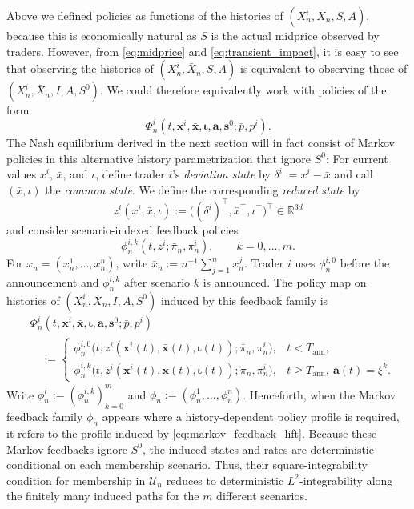 \documentclass[12pt]{article}
\numberwithin{equation}{section}
\theoremstyle{definition}
\begin{document}
Above we defined policies as functions of the histories of
\((X_n^i,\bar X_n,S,A)\), because this is economically natural
as \(S\) is the actual midprice observed by traders. However,
from \eqref{eq:midprice} and \eqref{eq:transient_impact}, it is easy to see that
observing the histories of \((X_n^i,\bar X_n,S,A)\) is equivalent to observing
those of \((X_n^i,\bar X_n,I,A,S^0)\). We could therefore equivalently work
with policies of the form
\begin{equation}\label{eq:equivalent_history_policy_parametrization}
\Phi_n^i(t,\mathbf{x}^i,\bar{\mathbf{x}},\boldsymbol{\iota},\mathbf{a},\mathbf{s}^0;\bar p,p^i).
\end{equation}
The Nash equilibrium derived
in the next section will in fact consist of Markov policies in this alternative
history parametrization that ignore \(S^0\):
For current values \(x^i\), \(\bar x\), and \(\iota\), define trader
\(i\)'s \emph{deviation state} by \(\delta^i:=x^i-\bar x\) and call
\((\bar x,\iota)\) the \emph{common state}. We define the corresponding \emph{reduced state} by
\begin{equation}\label{eq:reduced_state}
z^i(x^i,\bar x,\iota)
:=
\bigl((\delta^i)^\top,\bar x^\top,\iota^\top\bigr)^\top
\in\mathbb R^{3d}
\end{equation}
and consider scenario-indexed feedback policies
\begin{equation}\label{eq:markov_feedback}
\phi_n^{i,k}(t,z^i;\bar\pi_n,\pi_n^i),
\qquad k=0,\ldots,m.
\end{equation}
For \(x_n=(x_n^1,\ldots,x_n^n)\), write
\(\bar x_n:=n^{-1}\sum_{j=1}^n x_n^j\).
Trader \(i\) uses \(\phi_n^{i,0}\) before the announcement and
\(\phi_n^{i,k}\) after scenario \(k\) is announced. The policy map on
histories of \((X_n^i,\bar X_n,I,A,S^0)\) induced by this feedback family is
\begin{equation}\label{eq:markov_feedback_lift}
\begin{aligned}
&\Phi_n^i(t,\mathbf{x}^i,\bar{\mathbf{x}},\boldsymbol{\iota},\mathbf{a},\mathbf{s}^0;
\bar p,p^i)
\\
&\quad:=
\begin{cases}
\phi_n^{i,0}
\bigl(t,z^i(\mathbf{x}^i(t),\bar{\mathbf{x}}(t),\boldsymbol{\iota}(t));\bar\pi_n,\pi_n^i\bigr),
&t<T_{\mathrm{ann}},\\[2pt]
\phi_n^{i,k}
\bigl(t,z^i(\mathbf{x}^i(t),\bar{\mathbf{x}}(t),\boldsymbol{\iota}(t));\bar\pi_n,\pi_n^i\bigr),
&t\geq T_{\mathrm{ann}},\ \mathbf{a}(t)=\xi^k.
\end{cases}
\end{aligned}
\end{equation}
Write \(\phi_n^i:=(\phi_n^{i,k})_{k=0}^m\) and
\(\phi_n:=(\phi_n^1,\ldots,\phi_n^n)\). Henceforth, when the Markov feedback
family \(\phi_n\) appears where a history-dependent policy profile is
required, it refers to the profile induced by
\eqref{eq:markov_feedback_lift}.
Because these Markov
feedbacks ignore \(S^0\), the induced states and rates are deterministic
conditional on each membership scenario. Thus, their square-integrability condition for membership
in \(\mathcal U_n\) reduces to deterministic \(L^2\)-integrability along the
finitely many induced paths for the \(m\) different scenarios.
\end{document}
